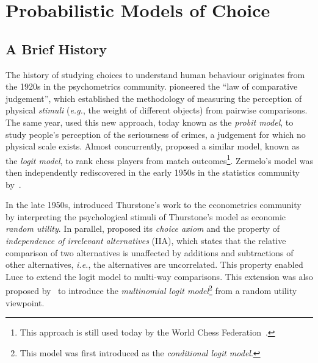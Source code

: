 \section{Probabilistic Models of Choice}
\label{in:sec:models}

\subsection{A Brief History}

The history of studying choices to understand human behaviour originates from the 1920s in the psychometrics community.
\citet{thurstone1927law} pioneered the ``law of comparative judgement'', which established the methodology of measuring the perception of physical \emph{stimuli} (\textit{e.g.}, the weight of different objects) from pairwise comparisons.
The same year, \citet{thurstone1927method} used this new approach, today known as the \emph{probit model}, to study people's perception of the seriousness of crimes, a judgement for which no physical scale exists.
Almost concurrently, \citet{zermelo1928berechnung} proposed a similar model, known as the \emph{logit model}, to rank chess players from match outcomes\footnote{This approach is still used today by the World Chess Federation~\citep{elo1978rating}.}.
Zermelo's model was then independently rediscovered in the early 1950s in the statistics community by~\citet{bradley1952rank}.

In the late 1950s, \citet{marschak1959binary} introduced Thurstone's work to the econometrics community by interpreting the psychological stimuli of Thurstone's model as economic \emph{random utility}.
In parallel, \citet{luce1959individual} proposed its \emph{choice axiom} and the property of \emph{independence of irrelevant alternatives} (IIA), which states that the relative comparison of two alternatives is unaffected by additions and subtractions of other alternatives, \textit{i.e.}, the alternatives are uncorrelated.
This property enabled Luce to extend the logit model to multi-way comparisons.
This extension was also proposed by~\citet{mcfadden1973conditional} to introduce the \emph{multinomial logit model}\footnote{This model was first introduced as the \emph{conditional logit model}.} from a random utility viewpoint.


